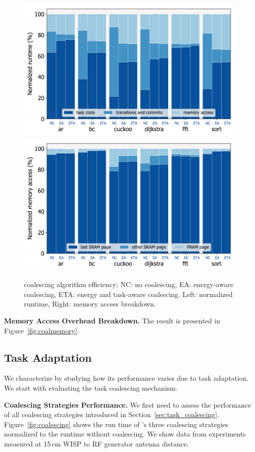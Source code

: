 \begin{figure}
	\centering
	\includegraphics[width=0.49\columnwidth]{figures/overallOverhead}
	\includegraphics[width=0.49\columnwidth]{figures/memAccess}
	\caption{\sys coalescing algorithm efficiency; NC: no coalescing, EA: energy-aware coalescing, ETA: energy and task-aware coalescing. Left: normalized runtime, Right: memory access breakdown.}
	\label{fig:coalEfficiency}
\end{figure}

\textbf{\sys Memory Access Overhead Breakdown.} The result is presented in Figure~\ref{fig:coalmemory}.


\subsection{\sys Task Adaptation}
\label{sec:result_coalescing}

We characterize \sys by studying how its performance varies due to task adaptation. We start with evaluating the task coalescing mechanism.


\textbf{Coalescing Strategies Performance.} We first need to assess the performance of all coalescing strategies introduced in Section~\ref{sec:task_coalescing}. Figure~\ref{fig:coalescing} shows the run time of \sys's three coalescing strategies normalized to the \sys runtime without coalescing.  We show data from experiments measured at 15\,cm WISP to RF generator antenna distance. 

